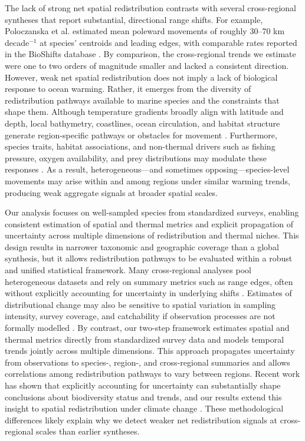 \documentclass[9pt,twocolumn,twoside]{pnas-new}
\begin{document}
The lack of strong net spatial redistribution contrasts with several cross-regional syntheses that report substantial, directional range shifts. For example, Poloczanska et al. \citep{poloczanska_global_2013} estimated mean poleward movements of roughly 30–70 km decade$^{-1}$ at species’ centroids and leading edges, with comparable rates reported in the BioShifts database \citep{lenoir_species_2020}. By comparison, the cross-regional trends we estimate were one to two orders of magnitude smaller and lacked a consistent direction. However, weak net spatial redistribution does not imply a lack of biological response to ocean warming. Rather, it emerges from the diversity of redistribution pathways available to marine species and the constraints that shape them. Although temperature gradients broadly align with latitude and depth, local bathymetry, coastlines, ocean circulation, and habitat structure generate region-specific pathways or obstacles for movement \citep{pinsky_marine_2013, garcia_molinos_climate_2016}. Furthermore, species traits, habitat associations, and non-thermal drivers such as fishing pressure, oxygen availability, and prey distributions may modulate these responses \citep{sunday_species_2015, deutsch_climate_2015, wisz_role_2013, bandara_importance_2024}. As a result, heterogeneous---and sometimes opposing---species-level movements may arise within and among regions under similar warming trends, producing weak aggregate signals at broader spatial scales.


Our analysis focuses on well-sampled species from standardized surveys, enabling consistent estimation of spatial and thermal metrics and explicit propagation of uncertainty across multiple dimensions of redistribution and thermal niches. This design results in narrower taxonomic and geographic coverage than a global synthesis, but it allows redistribution pathways to be evaluated within a robust and unified statistical framework. Many cross-regional analyses pool heterogeneous datasets and rely on summary metrics such as range edges, often without explicitly accounting for uncertainty in underlying shifts \citep{brown_ecological_2016, lenoir_species_2020, dahms_temperature_2023}. Estimates of distributional change may also be sensitive to spatial variation in sampling intensity, survey coverage, and catchability if observation processes are not formally modelled \citep{thorson_model-based_2016}. By contrast, our two-step framework estimates spatial and thermal metrics directly from standardized survey data and models temporal trends jointly across multiple dimensions. This approach propagates uncertainty from observations to species-, region-, and cross-regional summaries and allows correlations among redistribution pathways to vary between regions. Recent work has shown that explicitly accounting for uncertainty can substantially shape conclusions about biodiversity status and trends, and our results extend this insight to spatial redistribution under climate change \citep{johnson_revealing_2024}. These methodological differences likely explain why we detect weaker net redistribution signals at cross-regional scales than earlier syntheses.
\end{document}
